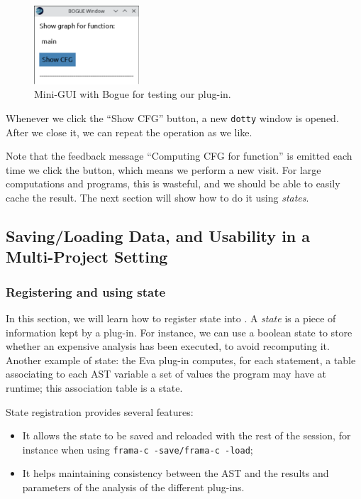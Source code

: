 \begin{figure}[htbp]
  \centering
  \includegraphics[width=0.35\textwidth]{./tutorial/viewcfg/pdfs/bogue.pdf}
  \caption{Mini-GUI with Bogue for testing our plug-in.}
  \label{fig:tut:bogue}
\end{figure}

Whenever we click the ``Show CFG'' button, a new \texttt{dotty} window is
opened. After we close it, we can repeat the operation as we like.

Note that the feedback message ``Computing CFG for function'' is emitted
each time we click the button, which means we perform a new visit.
For large computations and programs, this is wasteful,
and we should be able to easily cache the result.
The next section will show how to do it using {\em states}.

\subsection{Saving/Loading Data, and Usability in a Multi-Project Setting}
\label{tut2:project-and-state}

\subsubsection{Registering and using state}

In this section, we will learn how to register state into \framac. A
\emph{state} is a piece of information kept by a plug-in. For instance, we can
use a boolean state to store whether an expensive analysis has been executed,
to avoid recomputing it. Another example of state: the \textsf{Eva} plug-in
computes, for each statement, a table associating to each AST variable a set of
values the program may have at runtime; this association table is a state.

State registration provides several features:
\begin{itemize}
\item It allows the state to be saved and reloaded with the rest of
  the session, for instance when using \texttt{frama-c -save/frama-c
    -load};
\item It helps maintaining consistency between the AST and the results and
  parameters of the analysis of the different plug-ins.
\end{itemize}

